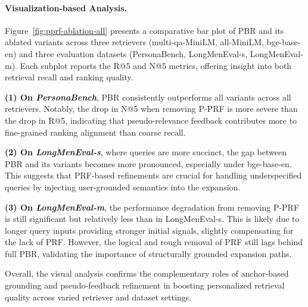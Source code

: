 \paragraph{Visualization-based Analysis.} 
Figure~\ref{fig:pprf-ablation-all} presents a comparative bar plot of PBR and its ablated variants across three retrievers (multi-qa-MiniLM, all-MiniLM, bge-base-en) and three evaluation datasets (PersonaBench, LongMenEval-s, LongMenEval-m). Each subplot reports the R@5 and N@5 metrics, offering insight into both retrieval recall and ranking quality.

\textbf{(1) On \textit{PersonaBench}}, PBR consistently outperforms all variants across all retrievers. Notably, the drop in N@5 when removing P-PRF is more severe than the drop in R@5, indicating that pseudo-relevance feedback contributes more to fine-grained ranking alignment than coarse recall.

\textbf{(2) On \textit{LongMenEval-s}}, where queries are more succinct, the gap between PBR and its variants becomes more pronounced, especially under bge-base-en. This suggests that PRF-based refinements are crucial for handling underspecified queries by injecting user-grounded semantics into the expansion.

\textbf{(3) On \textit{LongMenEval-m}}, the performance degradation from removing P-PRF is still significant but relatively less than in LongMenEval-s. This is likely due to longer query inputs providing stronger initial signals, slightly compensating for the lack of PRF. However, the logical and rough removal of PRF still lags behind full PBR, validating the importance of structurally grounded expansion paths.

Overall, the visual analysis confirms the complementary roles of anchor-based grounding and pseudo-feedback refinement in boosting personalized retrieval quality across varied retriever and dataset settings.